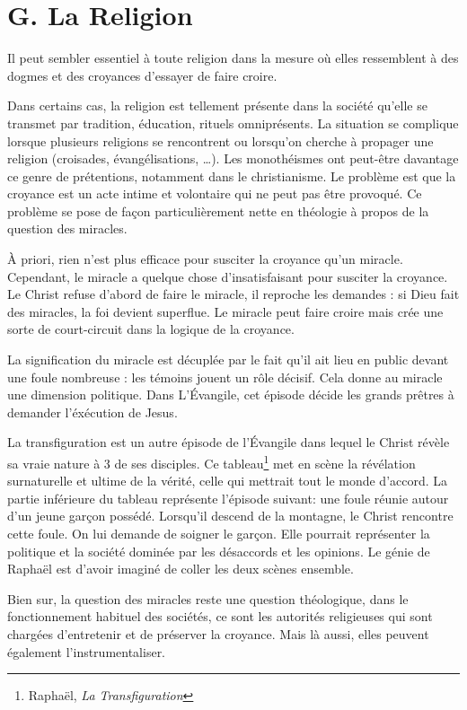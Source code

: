 \documentclass[12pt]{article}
\begin{document}
\section*{\color{red}G. La Religion}
Il peut sembler essentiel à toute religion dans la mesure où elles ressemblent à des dogmes et des croyances d'essayer de faire croire.\par
Dans certains cas, la religion est tellement présente dans la société qu'elle se transmet par tradition, éducation, rituels omniprésents.
La situation se complique lorsque plusieurs religions se rencontrent ou lorsqu'on cherche à propager une religion (croisades, évangélisations, \dots).
Les monothéismes ont peut-être davantage ce genre de prétentions, notamment dans le christianisme.
Le problème est que la croyance est un acte intime et volontaire qui ne peut pas être provoqué.
Ce problème se pose de façon particulièrement nette en théologie à propos de la question des miracles.\par
À priori, rien n'est plus efficace pour susciter la croyance qu'un miracle.
Cependant, le miracle a quelque chose d'insatisfaisant pour susciter la croyance.
Le Christ refuse d'abord de faire le miracle, il reproche les demandes : si Dieu fait des miracles, la foi devient superflue.
Le miracle peut faire croire mais crée une sorte de court-circuit dans la logique de la croyance.\par
La signification du miracle est décuplée par le fait qu'il ait lieu en public devant une foule nombreuse : les témoins jouent un rôle décisif.
Cela donne au miracle une dimension politique.
Dans L'Évangile, cet épisode décide les grands prêtres à demander l'éxécution de Jesus.\par
La transfiguration est un autre épisode de l'Évangile dans lequel le Christ révèle sa vraie nature à 3 de ses disciples.
Ce tableau\footnote{Raphaël, \emph{La Transfiguration}} met en scène la révélation surnaturelle et ultime de la vérité, celle qui mettrait tout le monde d'accord.
La partie inférieure du tableau représente l'épisode suivant: une foule réunie autour d'un jeune garçon possédé.
Lorsqu'il descend de la montagne, le Christ rencontre cette foule.
On lui demande de soigner le garçon. Elle pourrait représenter la politique et la société dominée par les désaccords et les opinions.
Le génie de Raphaël est d'avoir imaginé de coller les deux scènes ensemble.\par
Bien sur, la question des miracles reste une question théologique, dans le fonctionnement habituel des sociétés, ce sont les autorités religieuses qui sont chargées d'entretenir et de préserver la croyance.
Mais là aussi, elles peuvent également l'instrumentaliser.
\pagebreak
\end{document}
